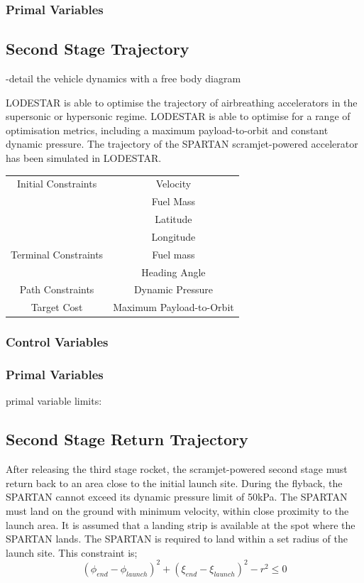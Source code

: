 \subsubsection{Primal Variables}

\subsection{Second Stage Trajectory}

-detail the vehicle dynamics with a free body diagram 

LODESTAR is able to optimise the trajectory of airbreathing accelerators in the supersonic or hypersonic regime. LODESTAR is able to optimise for a range of optimisation metrics, including a maximum payload-to-orbit and constant dynamic pressure.  
The trajectory of the SPARTAN scramjet-powered accelerator has been simulated in LODESTAR. 

\begin{tabular}{|c|c|}
	\hline Initial Constraints  & Velocity \\ & Fuel Mass  \\ & Latitude \\ & Longitude \\ 
	\hline Terminal Constraints & Fuel mass \\ & Heading Angle \\ 
	\hline Path Constraints & Dynamic Pressure \\ 
	\hline Target Cost & Maximum Payload-to-Orbit \\ 
	\hline 
\end{tabular} 

\subsubsection{Control Variables}

\subsubsection{Primal Variables}
primal variable limits:

\subsection{Second Stage Return Trajectory}
After releasing the third stage rocket, the scramjet-powered second stage must return back to an area close to the initial launch site.
During the flyback, the SPARTAN cannot exceed its dynamic pressure limit of 50kPa. 
The SPARTAN must land on the ground with minimum velocity, within close proximity to the launch area. It is assumed that a landing strip is available at the spot where the SPARTAN lands. The SPARTAN is required to land within a set radius of the launch site. This constraint is;
\begin{equation}
(\phi_{end} - \phi_{launch})^2 + (\xi_{end} - \xi_{launch})^2 - r^2 \leq 0
\end{equation}



